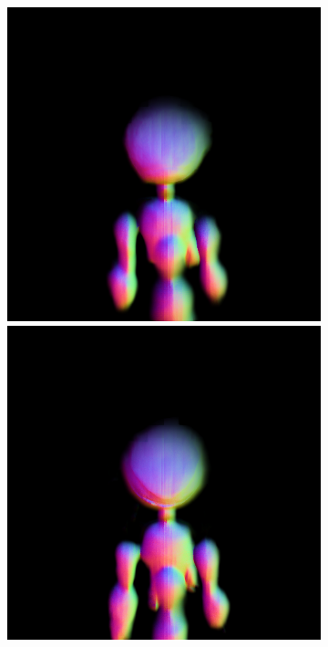 \begin{figure}[ht]
\begin{subfigure}[b]{0.20\textwidth}
        \includegraphics[width=\textwidth]{etc/a robot made out of plants/dreamfusion2/dreamfusion_plantrobot_5000_part2.png}
        \includegraphics[width=\textwidth]{etc/a robot made out of plants/dreamfusion2/dreamfusion_plantrobot_10000_part2.png}

\end{subfigure}
\end{figure}

